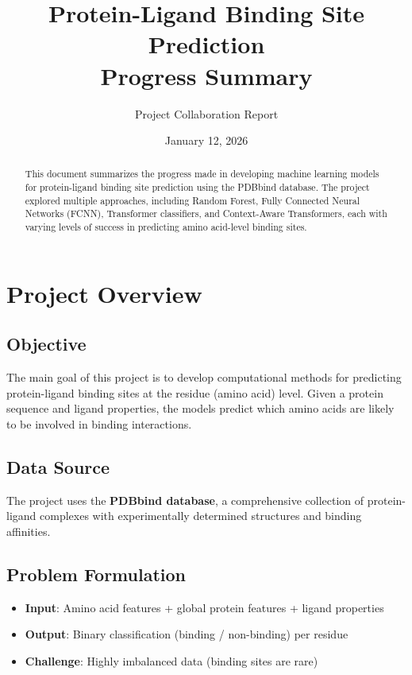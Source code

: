 \documentclass[11pt,a4paper]{article}
\title{\textbf{Protein-Ligand Binding Site Prediction}\\[0.5em]\Large Progress Summary}
\author{Project Collaboration Report}
\date{January 12, 2026}
\begin{document}
\maketitle

\begin{abstract}
This document summarizes the progress made in developing machine learning models for protein-ligand binding site prediction using the PDBbind database. The project explored multiple approaches, including Random Forest, Fully Connected Neural Networks (FCNN), Transformer classifiers, and Context-Aware Transformers, each with varying levels of success in predicting amino acid-level binding sites.
\end{abstract}

\tableofcontents
\newpage

\section{Project Overview}

\subsection{Objective}
The main goal of this project is to develop computational methods for predicting protein-ligand binding sites at the residue (amino acid) level. Given a protein sequence and ligand properties, the models predict which amino acids are likely to be involved in binding interactions.

\subsection{Data Source}
The project uses the \textbf{PDBbind database}, a comprehensive collection of protein-ligand complexes with experimentally determined structures and binding affinities.

\subsection{Problem Formulation}
\begin{itemize}
    \item \textbf{Input}: Amino acid features + global protein features + ligand properties
    \item \textbf{Output}: Binary classification (binding / non-binding) per residue
    \item \textbf{Challenge}: Highly imbalanced data (binding sites are rare)
\end{itemize}
\end{document}
